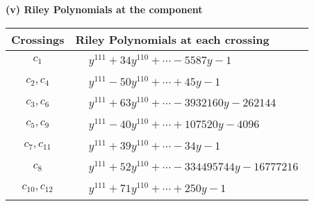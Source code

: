 \documentclass[1p]{elsarticle_modified}
\theoremstyle{definition}
\begin{document}
\flushleft \textbf{(v) Riley Polynomials at the component}\newline \\
\begin{tabular}{m{50pt}|m{274pt}}
Crossings & \hspace{64pt}Riley Polynomials at each crossing \\
\hline $$\begin{aligned}c_{1}\end{aligned}$$&$\begin{aligned}
&y^{111}+34 y^{110}+\cdots-5587 y-1
\end{aligned}$\\
\hline $$\begin{aligned}c_{2},c_{4}\end{aligned}$$&$\begin{aligned}
&y^{111}-50 y^{110}+\cdots+45 y-1
\end{aligned}$\\
\hline $$\begin{aligned}c_{3},c_{6}\end{aligned}$$&$\begin{aligned}
&y^{111}+63 y^{110}+\cdots-3932160 y-262144
\end{aligned}$\\
\hline $$\begin{aligned}c_{5},c_{9}\end{aligned}$$&$\begin{aligned}
&y^{111}-40 y^{110}+\cdots+107520 y-4096
\end{aligned}$\\
\hline $$\begin{aligned}c_{7},c_{11}\end{aligned}$$&$\begin{aligned}
&y^{111}+39 y^{110}+\cdots-34 y-1
\end{aligned}$\\
\hline $$\begin{aligned}c_{8}\end{aligned}$$&$\begin{aligned}
&y^{111}+52 y^{110}+\cdots-334495744 y-16777216
\end{aligned}$\\
\hline $$\begin{aligned}c_{10},c_{12}\end{aligned}$$&$\begin{aligned}
&y^{111}+71 y^{110}+\cdots+250 y-1
\end{aligned}$\\
\hline
\end{tabular}\\~\\
\end{document}
